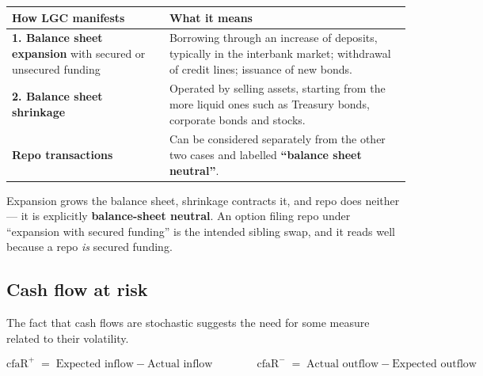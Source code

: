 \begin{center}
\small
\begin{tabularx}{\textwidth}{@{}p{4.3cm} X@{}}
\toprule
\rowcolor{FRMSoft}\textbf{How LGC manifests} & \textbf{What it means} \\
\midrule
\textbf{1. Balance sheet expansion} \newline with secured or unsecured funding &
Borrowing through an increase of deposits, typically in the interbank market; withdrawal of credit lines; issuance of new bonds. \\
\addlinespace
\textbf{2. Balance sheet shrinkage} &
Operated by selling assets, starting from the more liquid ones such as Treasury bonds, corporate bonds and stocks. \\
\addlinespace
\textbf{Repo transactions} &
Can be considered separately from the other two cases and labelled \textbf{``balance sheet neutral''}. \\
\bottomrule
\end{tabularx}
\end{center}

\begin{lrtrapbox}
Expansion grows the balance sheet, shrinkage contracts it, and repo does neither --- it is explicitly \textbf{balance-sheet neutral}. An option filing repo under ``expansion with secured funding'' is the intended sibling swap, and it reads well because a repo \emph{is} secured funding.
\end{lrtrapbox}

\subsection{Cash flow at risk}

The fact that cash flows are stochastic suggests the need for some measure related to their volatility.

\begin{lrfmlbox}
\[ \text{cfaR}^{+} \;=\; \text{Expected inflow} - \text{Actual inflow} \qquad\qquad
   \text{cfaR}^{-} \;=\; \text{Actual outflow} - \text{Expected outflow} \]
\end{lrfmlbox}

